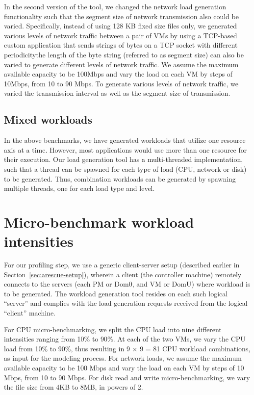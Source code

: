 In the second version of the tool, we changed 
the network load generation functionality such that
the segment size of network transmission also could be varied. 
Specifically, instead of using 128 KB fixed
size files only, we generated various levels of 
network traffic between a pair of VMs by using
a TCP-based custom application that sends 
strings of bytes on a
TCP socket with different periodicity\textemdash{}the 
length of the byte string (referred to as segment size)
can also be varied to generate different levels of network traffic.
We assume the maximum available capacity to be 100Mbps and vary the load on each VM by steps
of 10Mbps, from 10 to 90 Mbps. 
To generate various levels of network traffic, we varied
the transmission interval as well as the segment size of transmission.

\subsection{Mixed workloads}
In the above benchmarks, we have generated workloads that utilize one 
resource axis at a time. However, most applications would use more than
one resource for their execution.
Our load generation tool has a multi-threaded implementation, such that a thread 
can be spawned for each type of load (CPU, network or disk) to be generated.
Thus, combination workloads can be generated by spawning multiple threads, one 
for each load type and level. 

\section{Micro-benchmark workload intensities}
For our profiling step, we use a generic client-server setup (described earlier 
in Section~\ref{sec:arescue-setup}), wherein a client (the controller 
machine) remotely connects to the servers (each PM or Dom0, 
and VM or DomU) where workload is to be generated. The workload 
generation tool resides on each such logical ``server'' and complies 
with the load generation requests received from the logical ``client'' machine.

For CPU micro-benchmarking, we split the CPU load into nine different intensities ranging
from 10\% to 90\%. At each of the two VMs, we vary the CPU load from 10\% to 90\%, thus
resulting in 9 $\times$ 9 = 81 CPU workload combinations, as input for the modeling process. For
network loads, we assume the maximum available capacity to be 100 Mbps and vary the load on
each VM by steps of 10 Mbps, from 10 to 90 Mbps. For disk read and write micro-benchmarking,
we vary the file size from 4KB to 8MB, in powers of 2. 

